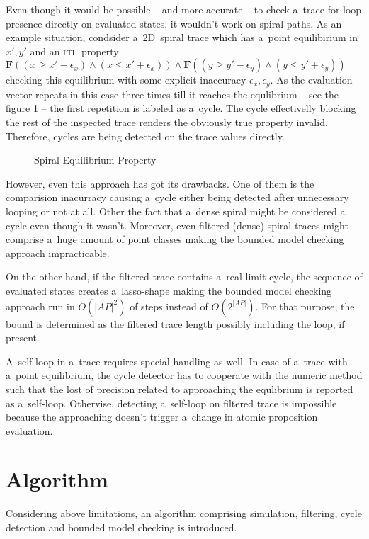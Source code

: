 \documentclass[12pt,oneside,draft]{fithesis}
\newcommand{\ltl}{\textsc{ltl}~}
\newcommand{\bF}{\mathbf{F}}
\begin{document}
Even though it would be possible -- and more accurate -- to check
a~trace for loop presence directly on evaluated states, it wouldn't
work on spiral paths. As an example situation, condsider a~2D~spiral
trace which has a~point equilibirium in $x',y'$ and an \ltl property
$\bF((x\ge x'-\epsilon_x)\wedge(x\le x'+\epsilon_x))\wedge
\bF((y\ge y'-\epsilon_y)\wedge(y\le y'+\epsilon_y))$ checking this
equilibrium with some explicit inaccuracy $\epsilon_x,\epsilon_y$.
As the evaluation vector repeats in this case three times till
it reaches the equlibrium -- see the figure \ref{spiral} --  the first
repetition is labeled as a~cycle. The cycle effectivelly blocking the
rest of the inspected trace renders the obviously true property invalid.
Therefore, cycles are being detected on the trace values directly.
\begin{figure}
%
\caption{Spiral Equilibrium Property}
\label{spiral}
\end{figure}

However, even this approach has got its drawbacks. One of them
is the comparision inacurracy causing a~cycle either being detected
after unnecessary looping or not at all. Other the fact that a~dense
spiral might be considered a cycle even though it wasn't. Moreover, even
filtered (dense) spiral traces might comprise a~huge amount of point
classes making the bounded model checking approach impracticable.

On the other hand, if the filtered trace contains a~real limit cycle,
the sequence of evaluated states creates a~lasso-shape making the
bounded model checking approach run in $O(|AP|^2)$ of steps
instead of $O(2^{|AP|})$\cite{biere}. For that purpose, the bound is
determined as the filtered trace length possibly including the loop, if
present.

A~self-loop in a~trace requires special handling as well. In case of
a~trace with a~point equilibrium, the cycle detector has to cooperate
with the numeric method such that the lost of precision related to
approaching the equlibrium is reported as a~self-loop. Othervise,
detecting a~self-loop on filtered trace is impossible because the
approaching doesn't trigger a~change in atomic proposition evaluation.


\section{Algorithm}
Considering above limitations, an algorithm comprising simulation,
filtering, cycle detection and bounded model checking is introduced.
\end{document}
